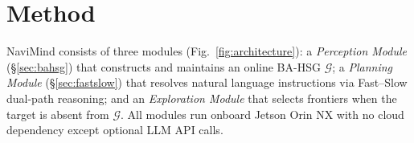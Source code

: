 \documentclass[conference]{IEEEtran}
\begin{document}
\section{Method}
\label{sec:method}

NaviMind consists of three modules (Fig.~\ref{fig:architecture}):
a \emph{Perception Module} (\S\ref{sec:bahsg}) that constructs and maintains an online BA-HSG $\mathcal{G}$;
a \emph{Planning Module} (\S\ref{sec:fastslow}) that resolves natural language instructions via Fast--Slow dual-path reasoning;
and an \emph{Exploration Module} that selects frontiers when the target is absent from $\mathcal{G}$.
All modules run onboard Jetson Orin NX with no cloud dependency except optional LLM API calls.
\end{document}
